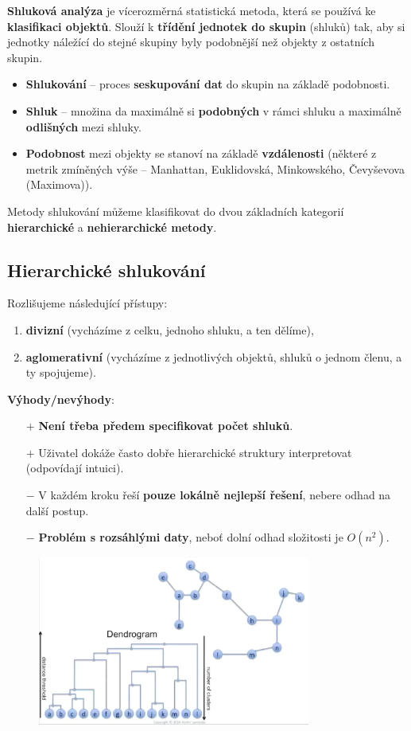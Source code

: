 \textbf{Shluková analýza} je vícerozměrná statistická metoda, která se používá ke \textbf{klasifikaci objektů}. Slouží k \textbf{třídění jednotek do skupin} (shluků) tak, aby si jednotky náležící do stejné skupiny byly podobnější než objekty z ostatních skupin.
\begin{itemize}
\item \textbf{Shlukování} -- proces \textbf{seskupování dat} do skupin na základě podobnosti.
\item \textbf{Shluk} -- množina da maximálně si \textbf{podobných} v rámci shluku a maximálně \textbf{odlišných} mezi shluky.
\item \textbf{Podobnost} mezi objekty se stanoví na základě \textbf{vzdálenosti} (některé z metrik zmíněných výše -- Manhattan, Euklidovská, Minkowského, Čevyševova (Maximova)).
\end{itemize}

Metody shlukování můžeme klasifikovat do dvou základních kategorií \textbf{hierarchické} a \textbf{nehierarchické metody}.

\subsection{Hierarchické shlukování}
Rozlišujeme následující přístupy:
\begin{enumerate}
\item \textbf{divizní} (vycházíme z celku, jednoho shluku, a ten dělíme),
\item \textbf{aglomerativní} (vycházíme z jednotlivých objektů, shluků o jednom členu, a ty spojujeme).
\end{enumerate}

\noindent \textbf{Výhody/nevýhody}:
\begin{itemize}
\item[$+$] \textbf{Není třeba předem specifikovat počet shluků}.
\item[$+$] Uživatel dokáže často dobře hierarchické struktury interpretovat (odpovídají intuici).
\item[$-$] V každém kroku řeší \textbf{pouze lokálně nejlepší řešení}, nebere odhad na další postup.
\item[$-$] \textbf{Problém s rozsáhlými daty}, neboť dolní odhad složitosti je $O(n^2)$.
\end{itemize}

\begin{figure}[H]
\centering
\includegraphics[width=0.8\textwidth]{assets/10_clustering}
\end{figure}

